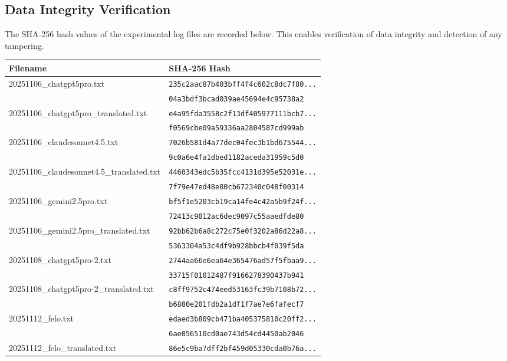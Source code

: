 \documentclass[11pt, a4paper]{article}
\begin{document}
\subsection{Data Integrity Verification}
The SHA-256 hash values of the experimental log files are recorded below. This enables verification of data integrity and detection of any tampering.

\begin{table}[h]
\centering
\small
\begin{tabular}{|l|l|}
\hline
\textbf{Filename} & \textbf{SHA-256 Hash} \\
\hline
20251106\_chatgpt5pro.txt & \texttt{235c2aac87b403bff4f4c602c8dc7f80...} \\
 & \texttt{04a3bdf3bcad039ae45694e4c95738a2} \\
\hline
20251106\_chatgpt5pro\_translated.txt & \texttt{e4a95fda3558c2f13df405977111bcb7...} \\
 & \texttt{f0569cbe09a59336aa2804587cd999ab} \\
\hline
20251106\_claudesonnet4.5.txt & \texttt{7026b581d4a77dec04fec3b1bd675544...} \\
 & \texttt{9c0a6e4fa1dbed1182aceda31959c5d0} \\
\hline
20251106\_claudesonnet4.5\_translated.txt & \texttt{4460343edc5b35fcc4131d395e52031e...} \\
 & \texttt{7f79e47ed48e80cb672340c048f00314} \\
\hline
20251106\_gemini2.5pro.txt & \texttt{bf5f1e5203cb19ca14fe4c42a5b9f24f...} \\
 & \texttt{72413c9012ac6dec9097c55aaedfde80} \\
\hline
20251106\_gemini2.5pro\_translated.txt & \texttt{92bb62b6a8c272c75e0f3202a86d22a8...} \\
 & \texttt{5363304a53c4df9b928bbcb4f039f5da} \\
\hline
20251108\_chatgpt5pro-2.txt & \texttt{2744aa66e6ea64e365476ad57f5fbaa9...} \\
 & \texttt{33715f01012487f9166278390437b941} \\
\hline
20251108\_chatgpt5pro-2\_translated.txt & \texttt{c8ff9752c474eed53163fc39b7108b72...} \\
 & \texttt{b6800e201fdb2a1df1f7ae7e6fafecf7} \\
\hline
20251112\_felo.txt & \texttt{edaed3b809cb471ba405375810c20ff2...} \\
 & \texttt{6ae056510cd0ae743d54cd4450ab2046} \\
\hline
20251112\_felo\_translated.txt & \texttt{86e5c9ba7dff2bf459d05330cda0b76a...} \\

\end{tabular}
\end{table}
\end{document}

